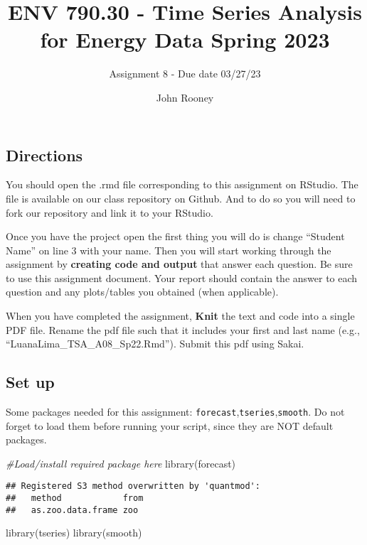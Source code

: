 \documentclass[
]{article}
\title{ENV 790.30 - Time Series Analysis for Energy Data \textbar{}
Spring 2023}
\subtitle{Assignment 8 - Due date 03/27/23}
\author{John Rooney}
\date{}
\newenvironment{Shaded}{\begin{snugshade}}{\end{snugshade}}
\newcommand{\CommentTok}[1]{\textcolor[rgb]{0.56,0.35,0.01}{\textit{#1}}}
\newcommand{\FunctionTok}[1]{\textcolor[rgb]{0.00,0.00,0.00}{#1}}
\newcommand{\NormalTok}[1]{#1}
\begin{document}
\maketitle

\hypertarget{directions}{%
\subsection{Directions}\label{directions}}

You should open the .rmd file corresponding to this assignment on
RStudio. The file is available on our class repository on Github. And to
do so you will need to fork our repository and link it to your RStudio.

Once you have the project open the first thing you will do is change
``Student Name'' on line 3 with your name. Then you will start working
through the assignment by \textbf{creating code and output} that answer
each question. Be sure to use this assignment document. Your report
should contain the answer to each question and any plots/tables you
obtained (when applicable).

When you have completed the assignment, \textbf{Knit} the text and code
into a single PDF file. Rename the pdf file such that it includes your
first and last name (e.g., ``LuanaLima\_TSA\_A08\_Sp22.Rmd''). Submit
this pdf using Sakai.

\hypertarget{set-up}{%
\subsection{Set up}\label{set-up}}

Some packages needed for this assignment:
\texttt{forecast},\texttt{tseries},\texttt{smooth}. Do not forget to
load them before running your script, since they are NOT default
packages.

\begin{Shaded}
\begin{Highlighting}[]
\CommentTok{\#Load/install required package here}
\FunctionTok{library}\NormalTok{(forecast)}
\end{Highlighting}
\end{Shaded}

\begin{verbatim}
## Registered S3 method overwritten by 'quantmod':
##   method            from
##   as.zoo.data.frame zoo
\end{verbatim}

\begin{Shaded}
\begin{Highlighting}[]
\FunctionTok{library}\NormalTok{(tseries)}
\FunctionTok{library}\NormalTok{(smooth)}
\end{Highlighting}
\end{Shaded}
\end{document}
